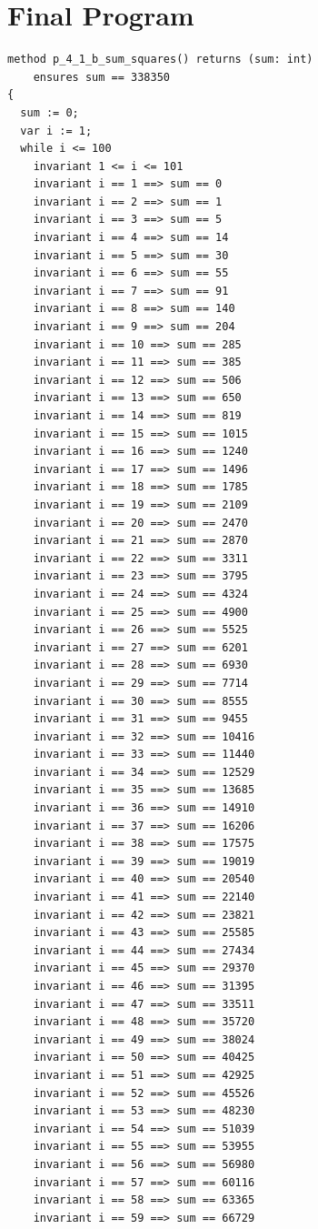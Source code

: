 \documentclass{article}
\begin{document}
\section*{Final Program}
\begin{lstlisting}
method p_4_1_b_sum_squares() returns (sum: int)
	ensures sum == 338350
{
  sum := 0;
  var i := 1;
  while i <= 100
    invariant 1 <= i <= 101
    invariant i == 1 ==> sum == 0
    invariant i == 2 ==> sum == 1
    invariant i == 3 ==> sum == 5
    invariant i == 4 ==> sum == 14
    invariant i == 5 ==> sum == 30
    invariant i == 6 ==> sum == 55
    invariant i == 7 ==> sum == 91
    invariant i == 8 ==> sum == 140
    invariant i == 9 ==> sum == 204
    invariant i == 10 ==> sum == 285
    invariant i == 11 ==> sum == 385
    invariant i == 12 ==> sum == 506
    invariant i == 13 ==> sum == 650
    invariant i == 14 ==> sum == 819
    invariant i == 15 ==> sum == 1015
    invariant i == 16 ==> sum == 1240
    invariant i == 17 ==> sum == 1496
    invariant i == 18 ==> sum == 1785
    invariant i == 19 ==> sum == 2109
    invariant i == 20 ==> sum == 2470
    invariant i == 21 ==> sum == 2870
    invariant i == 22 ==> sum == 3311
    invariant i == 23 ==> sum == 3795
    invariant i == 24 ==> sum == 4324
    invariant i == 25 ==> sum == 4900
    invariant i == 26 ==> sum == 5525
    invariant i == 27 ==> sum == 6201
    invariant i == 28 ==> sum == 6930
    invariant i == 29 ==> sum == 7714
    invariant i == 30 ==> sum == 8555
    invariant i == 31 ==> sum == 9455
    invariant i == 32 ==> sum == 10416
    invariant i == 33 ==> sum == 11440
    invariant i == 34 ==> sum == 12529
    invariant i == 35 ==> sum == 13685
    invariant i == 36 ==> sum == 14910
    invariant i == 37 ==> sum == 16206
    invariant i == 38 ==> sum == 17575
    invariant i == 39 ==> sum == 19019
    invariant i == 40 ==> sum == 20540
    invariant i == 41 ==> sum == 22140
    invariant i == 42 ==> sum == 23821
    invariant i == 43 ==> sum == 25585
    invariant i == 44 ==> sum == 27434
    invariant i == 45 ==> sum == 29370
    invariant i == 46 ==> sum == 31395
    invariant i == 47 ==> sum == 33511
    invariant i == 48 ==> sum == 35720
    invariant i == 49 ==> sum == 38024
    invariant i == 50 ==> sum == 40425
    invariant i == 51 ==> sum == 42925
    invariant i == 52 ==> sum == 45526
    invariant i == 53 ==> sum == 48230
    invariant i == 54 ==> sum == 51039
    invariant i == 55 ==> sum == 53955
    invariant i == 56 ==> sum == 56980
    invariant i == 57 ==> sum == 60116
    invariant i == 58 ==> sum == 63365
    invariant i == 59 ==> sum == 66729

\end{lstlisting}
\end{document}
